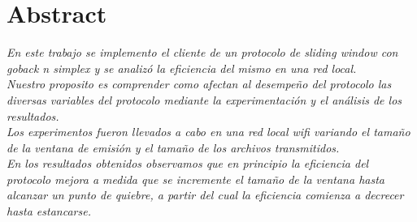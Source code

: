 \section*{\centering Abstract}

{\em
\indent	En este trabajo se implemento el cliente de un protocolo de sliding window con goback n simplex y se analizó la eficiencia del mismo en una red local.	\\
\indent	Nuestro proposito es comprender como afectan al desempeño del protocolo las diversas variables del protocolo mediante la experimentación y el análisis de los resultados.	\\
\indent	Los experimentos fueron llevados a cabo en una red local wifi variando el tamaño de la ventana de emisión y el tamaño de los archivos transmitidos.	\\
\indent	En los resultados obtenidos observamos que en principio la eficiencia del protocolo mejora a medida que se incremente el tamaño de la ventana hasta alcanzar un punto de quiebre, a partir del cual la eficiencia comienza a decrecer hasta estancarse.
}

